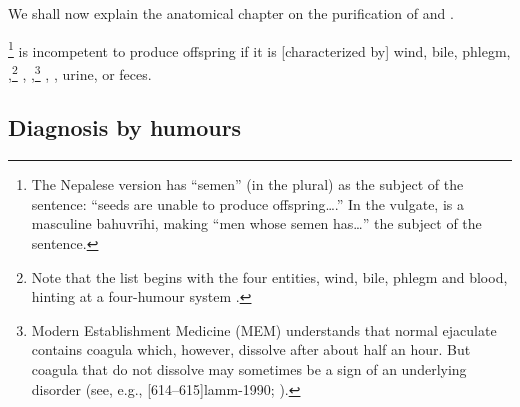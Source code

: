 \begin{translation}
    
    \item [1] 
    
    We shall now explain the anatomical chapter on the purification of 
     and 
    .
%    
    
    \item [3]  \footnote{The Nepalese version has
     “semen” (in the plural) as the subject of the
    sentence: “seeds are unable to produce offspring\ldots.”  In the
    vulgate,  is a masculine bahuvrīhi, making “men
    whose semen has\ldots” the subject of the sentence.} is
    incompetent to produce offspring if it is [characterized by] wind,
    bile, phlegm, ,\footnote{Note that the list
        begins with the four entities, wind, bile, phlegm and blood,
        hinting at a four-humour system \citep[see][485--486]{wuja-2000}.}
        ,
        ,\footnote{\label{granthi}Modern
            Establishment Medicine (MEM) understands that normal ejaculate
            contains coagula which, however, dissolve after about half an
            hour.  But coagula that do not dissolve may sometimes be a sign of
            an underlying disorder (see, e.g., 
            [614--615]{lamm-1990}; \cite{cohe-1990}).}
            , ,
            urine, or feces.
    
 \subsection{Diagnosis by humours}

 \item[4]
 

\end{translation}
